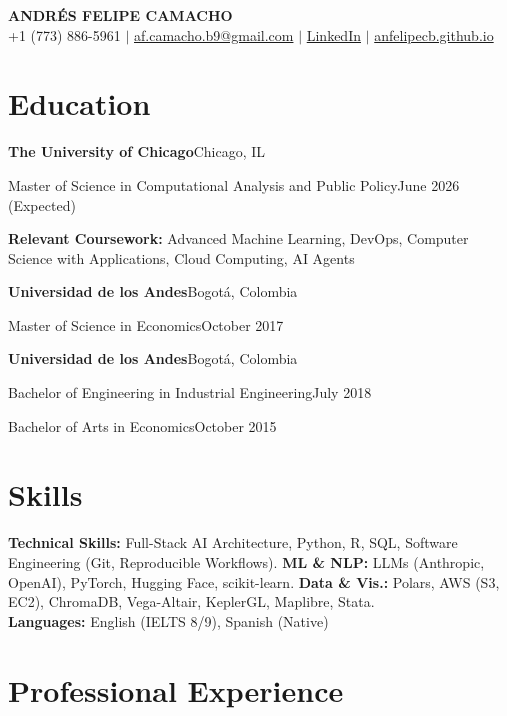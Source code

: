 \documentclass[10pt]{article}
\newcommand{\org}[2]{\noindent\textbf{#1}\hfill #2\par\vspace{0pt}}
\newcommand{\edu}[2]{\noindent #1\hfill #2\par\vspace{0pt}}
\newcommand{\entrygap}{\vspace{6pt}}
\begin{document}

\begin{center}
  {\LARGE\textbf{ANDRÉS FELIPE CAMACHO}}\\[4pt]
  +1 (773) 886-5961 $|$
  \href{mailto:af.camacho.b9@gmail.com}{af.camacho.b9@gmail.com} $|$
  \href{https://www.linkedin.com/in/anfelipecb/}{LinkedIn} $|$
  \href{https://anfelipecb.github.io/}{anfelipecb.github.io}
\end{center}

\vspace{3pt}

\section{Education}

\org{The University of Chicago}{Chicago, IL}
\edu{Master of Science in Computational Analysis and Public Policy}{June 2026 (Expected)}
\textbf{Relevant Coursework:} Advanced Machine Learning, DevOps, Computer Science with Applications, Cloud Computing, AI Agents

\entrygap
\org{Universidad de los Andes}{Bogotá, Colombia}
\edu{Master of Science in Economics}{October 2017}

\entrygap
\org{Universidad de los Andes}{Bogotá, Colombia}
\edu{Bachelor of Engineering in Industrial Engineering}{July 2018}
\edu{Bachelor of Arts in Economics}{October 2015}

\section{Skills}

\textbf{Technical Skills:} Full-Stack AI Architecture, Python, R, SQL, Software Engineering (Git, Reproducible Workflows). \textbf{ML \& NLP:} LLMs (Anthropic, OpenAI), PyTorch, Hugging Face, scikit-learn. \textbf{Data \& Vis.:} Polars, AWS (S3, EC2), ChromaDB, Vega-Altair, KeplerGL, Maplibre, Stata.\\
\textbf{Languages:} English (IELTS 8/9), Spanish (Native)

\section{Professional Experience}
\end{document}

